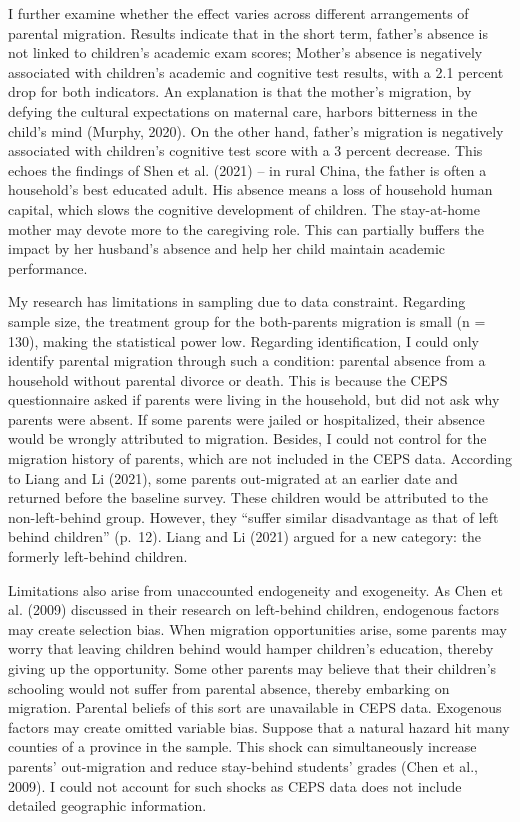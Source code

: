 \documentclass[
  man,floatsintext]{apa7}
\begin{document}
I further examine whether the effect varies across different arrangements of parental migration. Results indicate that in the short term, father's absence is not linked to children's academic exam scores; Mother's absence is negatively associated with children's academic and cognitive test results, with a 2.1 percent drop for both indicators. An explanation is that the mother's migration, by defying the cultural expectations on maternal care, harbors bitterness in the child's mind (Murphy, 2020). On the other hand, father's migration is negatively associated with children's cognitive test score with a 3 percent decrease. This echoes the findings of Shen et al. (2021) -- in rural China, the father is often a household's best educated adult. His absence means a loss of household human capital, which slows the cognitive development of children. The stay-at-home mother may devote more to the caregiving role. This can partially buffers the impact by her husband's absence and help her child maintain academic performance.

My research has limitations in sampling due to data constraint. Regarding sample size, the treatment group for the both-parents migration is small (n = 130), making the statistical power low. Regarding identification, I could only identify parental migration through such a condition: parental absence from a household without parental divorce or death. This is because the CEPS questionnaire asked if parents were living in the household, but did not ask why parents were absent. If some parents were jailed or hospitalized, their absence would be wrongly attributed to migration. Besides, I could not control for the migration history of parents, which are not included in the CEPS data. According to Liang and Li (2021), some parents out-migrated at an earlier date and returned before the baseline survey. These children would be attributed to the non-left-behind group. However, they ``suffer similar disadvantage as that of left behind children'' (p.~12). Liang and Li (2021) argued for a new category: the formerly left-behind children.

Limitations also arise from unaccounted endogeneity and exogeneity. As Chen et al. (2009) discussed in their research on left-behind children, endogenous factors may create selection bias. When migration opportunities arise, some parents may worry that leaving children behind would hamper children's education, thereby giving up the opportunity. Some other parents may believe that their children's schooling would not suffer from parental absence, thereby embarking on migration. Parental beliefs of this sort are unavailable in CEPS data. Exogenous factors may create omitted variable bias. Suppose that a natural hazard hit many counties of a province in the sample. This shock can simultaneously increase parents' out-migration and reduce stay-behind students' grades (Chen et al., 2009). I could not account for such shocks as CEPS data does not include detailed geographic information.
\end{document}
